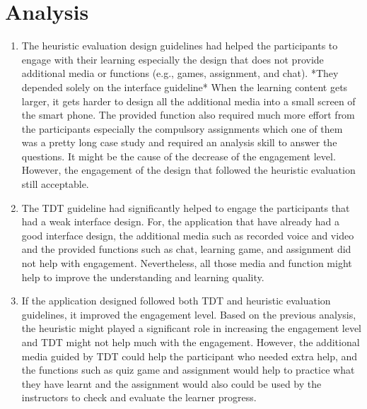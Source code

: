
\section{Analysis}
\begin{enumerate}

\item The heuristic evaluation design guidelines had helped the participants to engage with their learning especially the design that does not provide additional media or functions (e.g., games, assignment, and chat). 
*They depended solely on the interface guideline*
When the learning content gets larger, it gets harder to design all the additional media into a small screen of the smart phone. The provided function also required much more effort from the participants especially the compulsory assignments which one of them was a pretty long case study and required an analysis skill to answer the questions. It might be the cause of the decrease of the engagement level. However, the engagement of the design that followed the heuristic evaluation still acceptable. 

\item The TDT guideline had significantly helped to engage the participants that had a weak interface design. For, the application that have already had a good interface design, the additional media such as recorded voice and video and the provided functions such as chat, learning game, and assignment did not help with engagement. Nevertheless, all those media and function might help to improve the understanding and learning quality. 

\item If the application designed followed both TDT and heuristic evaluation guidelines, it improved the engagement level. Based on the previous analysis, the heuristic might played a significant role in increasing the engagement level and TDT might not help much with the engagement. However, the additional media guided by TDT could help the participant who needed extra help, and the functions such as quiz game and assignment would help to practice what they have learnt and the assignment would also could be used by the instructors to check and evaluate the learner progress. 

\end{enumerate} 


 








































